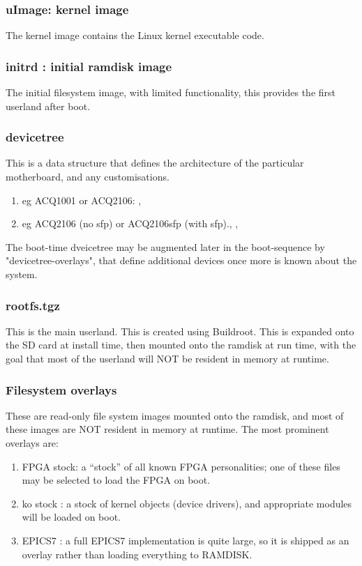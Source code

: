 \documentclass[]{article}
\begin{document}
\subsubsection{uImage: kernel image}
The kernel image contains the Linux kernel executable code.

\subsubsection{initrd : initial ramdisk image}
The initial filesystem image, with limited functionality, this provides the first userland after boot.

\subsubsection{devicetree}
This is a data structure that defines the architecture of the particular motherboard, and any customisations.
\begin{enumerate}
    \item eg ACQ1001 or ACQ2106: , 
    \item eg ACQ2106 (no sfp) or ACQ2106sfp (with sfp)., , 
\end{enumerate}
The boot-time dveicetree may be augmented later in the boot-sequence by "devicetree-overlays", that define additional devices once more is known about the system.

\subsubsection{rootfs.tgz}
This is the main userland. This is created using Buildroot. This is expanded onto the SD card at install time, then mounted onto the ramdisk at run time, with the goal that most of the userland will NOT be resident in memory at runtime.

\subsubsection{Filesystem overlays}
These are read-only file system images mounted onto the ramdisk, and most of these images are NOT resident in memory at runtime. The most prominent overlays are:
\begin{enumerate}
    \item FPGA stock: a “stock” of all known FPGA personalities; one of these files may be selected to load the FPGA on boot.
    \item ko stock : a stock of kernel objects (device drivers), and appropriate modules will be loaded on boot.
    \item EPICS7 : a full EPICS7 implementation is quite large, so it is shipped as an overlay rather than loading everything to RAMDISK.
\end{enumerate}
\end{document}
